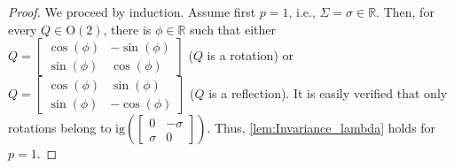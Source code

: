 \documentclass[10pt,twoside,dvipsnames]{siamart1116}
\numberwithin{algorithm}{section}
\numberwithin{equation}{section}
\begin{document}
	\begin{proof}
	We proceed by induction. Assume first $p=1$, i.e., $\Sigma=\sigma \in \mathbb{R}$. Then, for every $Q\in\mathrm{O}(2)$, there is $\phi\in\mathbb{R}$ such that either  $Q=\left[\begin{smallmatrix}
		\cos(\phi)&-\sin(\phi)\\
		\sin(\phi)&\cos(\phi)
		\end{smallmatrix}\right]$ ($Q$ is a rotation) or $Q=\left[\begin{smallmatrix}
		\cos(\phi)&\sin(\phi)\\
		\sin(\phi)&-\cos(\phi)
		\end{smallmatrix}\right]$ ($Q$ is a reflection). It is easily verified that only rotations belong to $\mathrm{ig}\left(\left[\begin{smallmatrix}
		0&-\sigma\\
		\sigma&0
		\end{smallmatrix}\right]\right)$. Thus, \cref{lem:Invariance_lambda} holds for $p=1$. 
		

\end{proof}
\end{document}
